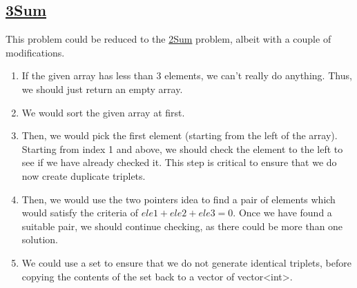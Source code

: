 \documentclass[11pt]{article}
\begin{document}
\subsection{
 \href{https://leetcode.com/problems/3sum/}{3Sum}
}

This problem could be reduced to the \href{https://leetcode.com/problems/two-sum/}{2Sum}
problem, albeit with a couple of modifications.
\begin{enumerate}
 \item{
             If the given array has less than 3 elements, we can't really do anything. Thus, we should just return an empty array.
             
       }
 \item{
             We would sort the given array at first.
       }
 \item{
             Then, we would pick the first element (starting from the left of the array).
             Starting from index 1 and above, we should check the element to the left to see if we have already checked it. This step is critical to ensure that we do now create duplicate triplets.
       }
 \item {
       Then, we would use the two pointers idea to find a pair of elements which would satisfy the criteria of $ele1+ele2+ele3=0$. Once we have found a suitable pair, we should continue checking, as there could be more than one solution.
       
       }
       \item{
                   We could use a set to ensure that we do not generate identical triplets, before copying the contents of the set back to a vector of vector<int>.
             }
\end{enumerate}
\end{document}

